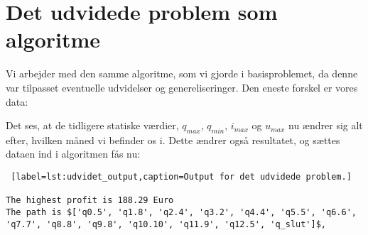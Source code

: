 \section{Det udvidede problem som algoritme}
Vi arbejder med den samme algoritme, som vi gjorde i basisproblemet, da denne var tilpasset eventuelle udvidelser og genereliseringer. Den eneste forskel er vores data:

 

Det ses, at de tidligere statiske værdier, $q_{max}$, $q_{min}$, $i_{max}$ og $u_{max}$ nu ændrer sig alt efter, hvilken måned vi befinder os i. Dette ændrer også resultatet, og sættes dataen ind i algoritmen fås nu:

\begin{lstlisting} [label=lst:udvidet_output,caption=Output for det udvidede problem.]

The highest profit is 188.29 Euro
The path is $['q0.5', 'q1.8', 'q2.4', 'q3.2', 'q4.4', 'q5.5', 'q6.6', 'q7.7', 'q8.8', 'q9.8', 'q10.10', 'q11.9', 'q12.5', 'q_slut']$,

\end{lstlisting}